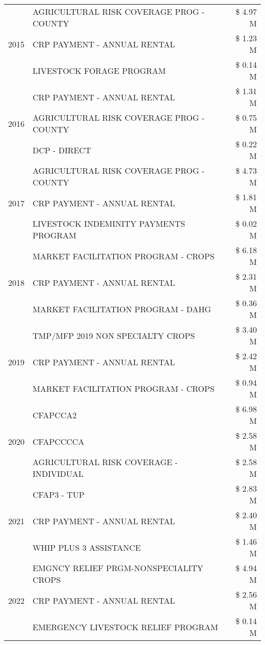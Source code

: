 \begin{tabular}{llr}
\cline{1-3}
\multirow[t]{3}{*}{2015} & AGRICULTURAL RISK COVERAGE PROG - COUNTY & \$ 4.97 M \\
 & CRP PAYMENT - ANNUAL RENTAL & \$ 1.23 M \\
 & LIVESTOCK FORAGE PROGRAM & \$ 0.14 M \\
\cline{1-3}
\multirow[t]{3}{*}{2016} & CRP PAYMENT - ANNUAL RENTAL & \$ 1.31 M \\
 & AGRICULTURAL RISK COVERAGE PROG - COUNTY & \$ 0.75 M \\
 & DCP - DIRECT & \$ 0.22 M \\
\cline{1-3}
\multirow[t]{3}{*}{2017} & AGRICULTURAL RISK COVERAGE PROG - COUNTY & \$ 4.73 M \\
 & CRP PAYMENT - ANNUAL RENTAL & \$ 1.81 M \\
 & LIVESTOCK INDEMINITY PAYMENTS PROGRAM & \$ 0.02 M \\
\cline{1-3}
\multirow[t]{3}{*}{2018} & MARKET FACILITATION PROGRAM - CROPS & \$ 6.18 M \\
 & CRP PAYMENT - ANNUAL RENTAL & \$ 2.31 M \\
 & MARKET FACILITATION PROGRAM - DAHG & \$ 0.36 M \\
\cline{1-3}
\multirow[t]{3}{*}{2019} & TMP/MFP 2019 NON SPECIALTY CROPS & \$ 3.40 M \\
 & CRP PAYMENT - ANNUAL RENTAL & \$ 2.42 M \\
 & MARKET FACILITATION PROGRAM - CROPS & \$ 0.94 M \\
\cline{1-3}
\multirow[t]{3}{*}{2020} & CFAPCCA2 & \$ 6.98 M \\
 & CFAPCCCCA & \$ 2.58 M \\
 & AGRICULTURAL RISK COVERAGE - INDIVIDUAL & \$ 2.58 M \\
\cline{1-3}
\multirow[t]{3}{*}{2021} & CFAP3 - TUP & \$ 2.83 M \\
 & CRP PAYMENT - ANNUAL RENTAL & \$ 2.40 M \\
 & WHIP PLUS 3 ASSISTANCE & \$ 1.46 M \\
\cline{1-3}
\multirow[t]{3}{*}{2022} & EMGNCY RELIEF PRGM-NONSPECIALITY CROPS & \$ 4.94 M \\
 & CRP PAYMENT - ANNUAL RENTAL & \$ 2.56 M \\
 & EMERGENCY LIVESTOCK RELIEF PROGRAM & \$ 0.14 M \\
\cline{1-3}
\bottomrule
\end{tabular}
